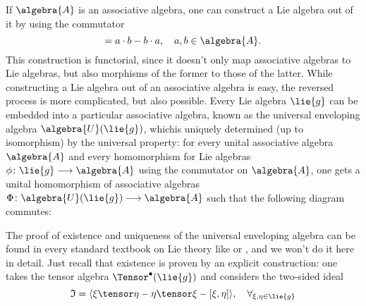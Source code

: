 If $\algebra{A}$ is an associative algebra, one can construct a Lie algebra 
out of it by using the commutator
\begin{equation*}
	[a,b]
	=
	a \cdot b - b \cdot a
	, \quad
	a,b \in \algebra{A}.
\end{equation*}
This construction is functorial, since it doesn't only map associative 
algebras to Lie algebras, but also morphisms of the former to those of the 
latter. While constructing a Lie algebra out of an associative algebra is 
easy, the reversed process is more complicated, but also possible. Every 
Lie algebra $\lie{g}$ can be embedded into a particular associative 
algebra, known as the universal enveloping algebra $\algebra{U}(\lie{g})$, 
whichis uniquely determined (up to isomorphism) by the universal property: 
for every unital associative algebra $\algebra{A}$ and every homomorphism 
for Lie algebras $\phi\colon \lie{g} \longrightarrow \algebra{A}$ using the 
commutator on $\algebra{A}$, one gets a unital homomorphism of associative 
algebras $\Phi \colon \algebra{U}(\lie{g}) \longrightarrow \algebra{A}$ 
such that the following diagram commutes:
\begin{center}
\end{center}
The proof of existence and uniqueness of the universal enveloping algebra 
can be found in every standard textbook on Lie theory like 
\cite{hilgert.neeb:2012a} or \cite{varadarajan:1974a}, and we won't do it 
here in detail. Just recall that existence is proven by an explicit 
construction: one takes the tensor algebra $\Tensor^{\bullet}(\lie{g})$ and 
considers the two-sided ideal
\begin{equation*}
	\mathfrak{I}
	=
	\langle \xi \tensor \eta - \eta \tensor \xi - [\xi, \eta] \rangle
	, \quad
	\forall_{\xi, \eta \in \lie{g}}
\end{equation*}
